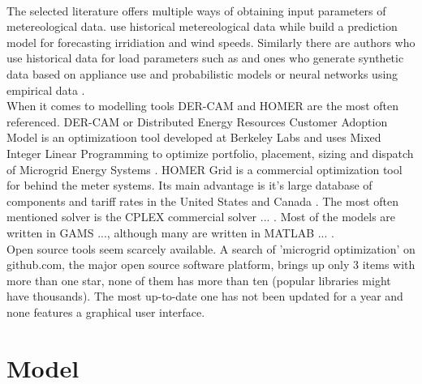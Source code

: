 \documentclass[
	11pt,								%
	DIV10,								%
	a4paper,         					%
	oneside,							%
	headheight=20pt,					%
	footheight=20pt,					%
    parskip=full,						%
    listof=totoc,						%
	bibliography=totoc,					%
	index=totoc,						%
]{scrartcl}
\begin{document}
\\
The selected literature offers multiple ways of obtaining input parameters of metereological data. \cite{7981571} use historical metereological data while \cite{palma2013microgrid} build a prediction model for forecasting irridiation and wind speeds. Similarly there are authors who use historical data for load parameters such as \cite{7981571} and ones who generate synthetic data based on appliance use and probabilistic models \cite{zhang2013efficient}\cite{zhang2011optimal}\cite{zhang2015optimal} or neural networks using empirical data \cite{palma2013microgrid}.
\\
When it comes to modelling tools DER-CAM \cite{LAUINGER201624}\cite{ZHENG2018204}\cite{8023785} and HOMER \cite{amrollahi2017techno}\cite{ZHENG2018204}\cite{LAUINGER201624} are the most often referenced. DER-CAM or Distributed Energy Resources Customer Adoption Model is an optimizatioon tool developed at Berkeley Labs and uses Mixed Integer Linear Programming to optimize portfolio, placement, sizing and dispatch of Microgrid Energy Systems \cite{DistributedEnergyResources2018}. HOMER Grid is a commercial optimization tool for behind the meter systems. Its main advantage is it's large database of components and tariff rates in the United States and Canada \cite{HOMERGridBehindtheMeter2018}. The most often mentioned solver is the CPLEX commercial solver \cite{sechilariu2014supervision}\cite{NEMATI2018944}\cite{UMEOZOR2016672}\cite{7741704}... . Most of the models are written in GAMS \cite{silvente2015rolling}\cite{UMEOZOR2016672}\cite{CRAPARO2017135}..., although many are written in MATLAB \cite{7741704}\cite{7972908}... .
\\
Open source tools seem scarcely available. A search of 'microgrid optimization' on github.com, the major open source software platform, brings up only 3 items with more than one star, none of them has more than ten (popular libraries might have thousands)\cite{GithubSearchMicrogrid2018}. The most up-to-date one has not been updated for a year and none features a graphical user interface.

\newpage
\section{Model}
\end{document}
